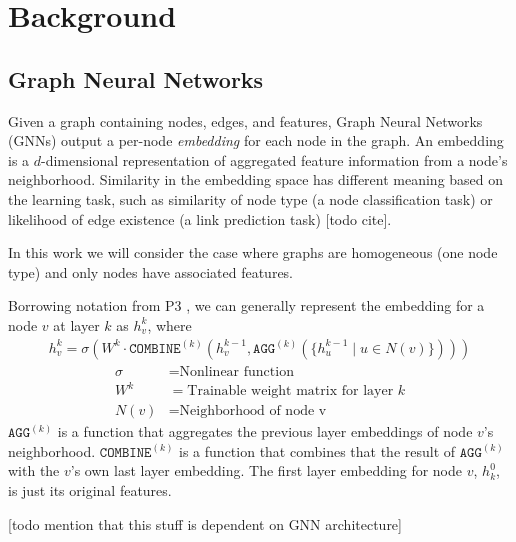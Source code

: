\chapter{Background}

\section{Graph Neural Networks}
Given a graph containing nodes, edges, and features, Graph Neural Networks (GNNs) output a per-node \textit{embedding} for each node in the graph.
An embedding is a $d$-dimensional representation of aggregated feature information from a node's neighborhood. 
Similarity in the embedding space has different meaning based on the learning task, such as similarity of node type (a node classification task) or likelihood of edge existence (a link prediction task) [todo cite]. 

In this work we will consider the case where graphs are homogeneous (one node type) and only nodes have associated features.

Borrowing notation from P3 \cite{P3_2021}, we can generally represent the embedding for a node $v$ at layer $k$ as $h_v^k$, where
\begin{align} \label{GNN Equation}
    h_v^k = \sigma \left(
         W^k \cdot 
         \mathtt{COMBINE}^{(k)} \left(
            h_v^{k-1},
            \mathtt{AGG}^{(k)} \left( 
                    \{ h_u^{k-1} \mid u \in N(v) \}
                \right) 
         \right)
     \right)
\end{align}
\begin{align*}
    \sigma &= \text{Nonlinear function} \\
    W^k &= \text{Trainable weight matrix for layer $k$} \\
    N(v) &= \text{Neighborhood of node v}
\end{align*}
$\mathtt{AGG}^{(k)}$ is a function that aggregates the previous layer embeddings of node $v$'s neighborhood. 
$\mathtt{COMBINE}^{(k)}$ is a function that combines that the result of $\mathtt{AGG}^{(k)}$ with the $v$'s own last layer embedding. 
The first layer embedding for node $v$, $h_k^0$, is just its original features.

[todo mention that this stuff is dependent on GNN architecture]

